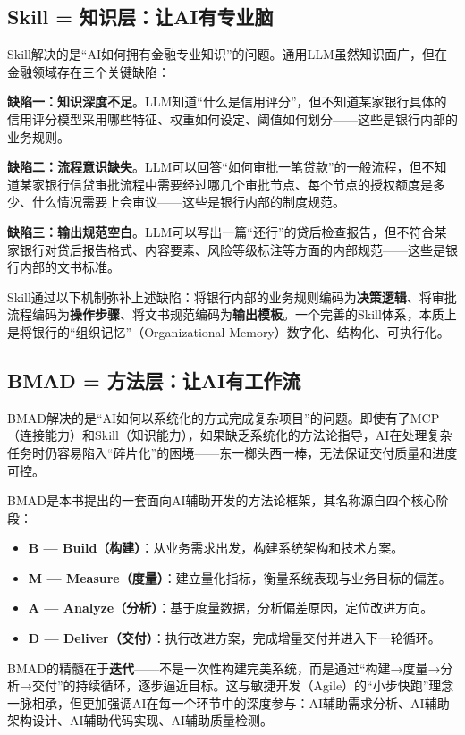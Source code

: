 \subsection{Skill = 知识层：让AI有专业脑}

Skill解决的是``AI如何拥有金融专业知识''的问题。通用LLM虽然知识面广，但在金融领域存在三个关键缺陷：

\textbf{缺陷一：知识深度不足}。LLM知道``什么是信用评分''，但不知道某家银行具体的信用评分模型采用哪些特征、权重如何设定、阈值如何划分——这些是银行内部的业务规则。

\textbf{缺陷二：流程意识缺失}。LLM可以回答``如何审批一笔贷款''的一般流程，但不知道某家银行信贷审批流程中需要经过哪几个审批节点、每个节点的授权额度是多少、什么情况需要上会审议——这些是银行内部的制度规范。

\textbf{缺陷三：输出规范空白}。LLM可以写出一篇``还行''的贷后检查报告，但不符合某家银行对贷后报告格式、内容要素、风险等级标注等方面的内部规范——这些是银行内部的文书标准。

Skill通过以下机制弥补上述缺陷：将银行内部的业务规则编码为\textbf{决策逻辑}、将审批流程编码为\textbf{操作步骤}、将文书规范编码为\textbf{输出模板}。一个完善的Skill体系，本质上是将银行的``组织记忆''（Organizational Memory）数字化、结构化、可执行化。

\subsection{BMAD = 方法层：让AI有工作流}

BMAD解决的是``AI如何以系统化的方式完成复杂项目''的问题。即使有了MCP（连接能力）和Skill（知识能力），如果缺乏系统化的方法论指导，AI在处理复杂任务时仍容易陷入``碎片化''的困境——东一榔头西一棒，无法保证交付质量和进度可控。

BMAD是本书提出的一套面向AI辅助开发的方法论框架，其名称源自四个核心阶段：

\begin{itemize}[leftmargin=2em]
  \item \textbf{B — Build（构建）}：从业务需求出发，构建系统架构和技术方案。
  \item \textbf{M — Measure（度量）}：建立量化指标，衡量系统表现与业务目标的偏差。
  \item \textbf{A — Analyze（分析）}：基于度量数据，分析偏差原因，定位改进方向。
  \item \textbf{D — Deliver（交付）}：执行改进方案，完成增量交付并进入下一轮循环。
\end{itemize}

BMAD的精髓在于\textbf{迭代}——不是一次性构建完美系统，而是通过``构建→度量→分析→交付''的持续循环，逐步逼近目标。这与敏捷开发（Agile）的``小步快跑''理念一脉相承，但更加强调AI在每一个环节中的深度参与：AI辅助需求分析、AI辅助架构设计、AI辅助代码实现、AI辅助质量检测。

